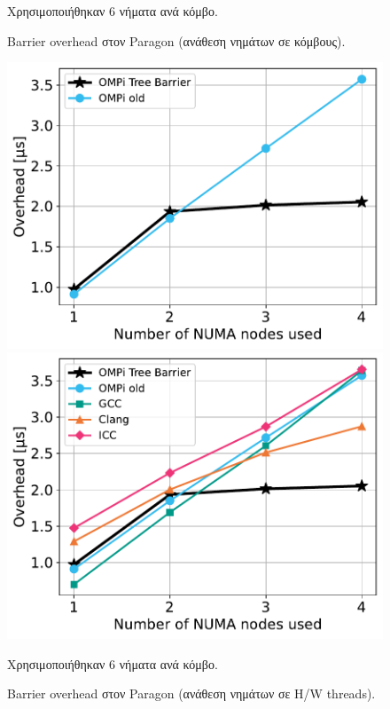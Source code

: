 \begin{figure}[htbp]
\begin{minipage}{0.48\textwidth}
    \end{minipage}
    \newline \newline
    {\small Χρησιμοποιήθηκαν 6 νήματα ανά κόμβο.}
    \caption{Barrier overhead στον Paragon (ανάθεση νημάτων σε κόμβους).}
    \label{fig:bo-paragon-toponodes}
\end{figure}

\begin{figure}[htbp]
    \centering
    \begin{minipage}{0.48\textwidth}
        \centering
        \includegraphics[width=1\textwidth]{Figures/paragon-epcc/ompionly_topothreads_tpn-6_close.pdf}
    \end{minipage}\hfill
    \begin{minipage}{0.48\textwidth}
        \centering
        \includegraphics[width=1\textwidth]{Figures/paragon-epcc/topothreads_tpn-6_close.pdf}
    \end{minipage}
    \newline \newline
    {\small Χρησιμοποιήθηκαν 6 νήματα ανά κόμβο.}
    \caption{Barrier overhead στον Paragon (ανάθεση νημάτων σε H/W threads).}
    \label{fig:bo-paragon-topothreads}
\end{figure}


